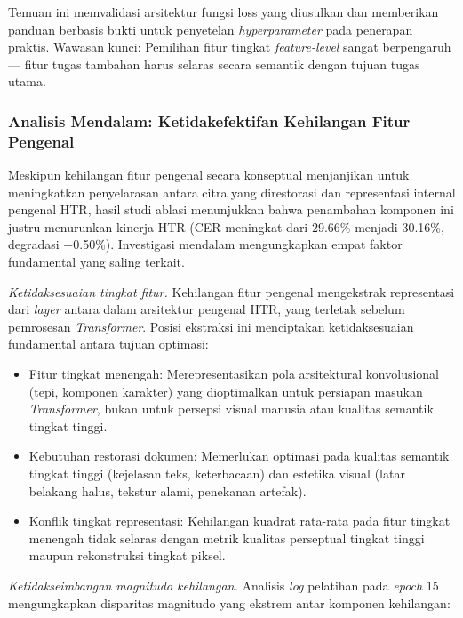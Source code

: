 \documentclass[journal]{IEEEtran}
\begin{document}
Temuan ini memvalidasi arsitektur fungsi loss yang diusulkan dan memberikan panduan berbasis bukti untuk penyetelan \textit{hyperparameter} pada penerapan praktis. Wawasan kunci: Pemilihan fitur tingkat \textit{feature-level} sangat berpengaruh — fitur tugas tambahan harus selaras secara semantik dengan tujuan tugas utama.

\subsubsection{Analisis Mendalam: Ketidakefektifan Kehilangan Fitur Pengenal}
\label{sec:recfeat_analysis}

Meskipun kehilangan fitur pengenal secara konseptual menjanjikan untuk meningkatkan penyelarasan antara citra yang direstorasi dan representasi internal pengenal HTR, hasil studi ablasi menunjukkan bahwa penambahan komponen ini justru menurunkan kinerja HTR (CER meningkat dari 29.66\% menjadi 30.16\%, degradasi +0.50\%). Investigasi mendalam mengungkapkan empat faktor fundamental yang saling terkait.

\textit{Ketidaksesuaian tingkat fitur.} Kehilangan fitur pengenal mengekstrak representasi dari \textit{layer} antara dalam arsitektur pengenal HTR, yang terletak sebelum pemrosesan \textit{Transformer}. Posisi ekstraksi ini menciptakan ketidaksesuaian fundamental antara tujuan optimasi:

\begin{itemize}
    \item Fitur tingkat menengah: Merepresentasikan pola arsitektural konvolusional (tepi, komponen karakter) yang dioptimalkan untuk persiapan masukan \textit{Transformer}, bukan untuk persepsi visual manusia atau kualitas semantik tingkat tinggi.
    
    \item Kebutuhan restorasi dokumen: Memerlukan optimasi pada kualitas semantik tingkat tinggi (kejelasan teks, keterbacaan) dan estetika visual (latar belakang halus, tekstur alami, penekanan artefak).
    
    \item Konflik tingkat representasi: Kehilangan kuadrat rata-rata pada fitur tingkat menengah tidak selaras dengan metrik kualitas perseptual tingkat tinggi maupun rekonstruksi tingkat piksel.
\end{itemize}

\textit{Ketidakseimbangan magnitudo kehilangan.} Analisis \textit{log} pelatihan pada \textit{epoch} 15 mengungkapkan disparitas magnitudo yang ekstrem antar komponen kehilangan:
\end{document}
